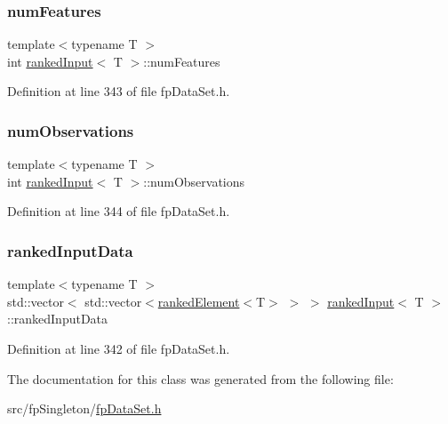 \subsubsection{\texorpdfstring{num\+Features}{numFeatures}}
{\footnotesize\ttfamily template$<$typename T $>$ \\
int \hyperlink{classrankedInput}{ranked\+Input}$<$ T $>$\+::num\+Features\hspace{0.3cm}{\ttfamily [private]}}



Definition at line 343 of file fp\+Data\+Set.\+h.

\mbox{\label{classrankedInput_a7b0e6ebcf6fa2fcd0b08918e3b3020be}} 
\subsubsection{\texorpdfstring{num\+Observations}{numObservations}}
{\footnotesize\ttfamily template$<$typename T $>$ \\
int \hyperlink{classrankedInput}{ranked\+Input}$<$ T $>$\+::num\+Observations\hspace{0.3cm}{\ttfamily [private]}}



Definition at line 344 of file fp\+Data\+Set.\+h.

\mbox{\label{classrankedInput_a5450364c3f258e15f28248a8a3c93ffa}} 
\subsubsection{\texorpdfstring{ranked\+Input\+Data}{rankedInputData}}
{\footnotesize\ttfamily template$<$typename T $>$ \\
std\+::vector$<$ std\+::vector$<$\hyperlink{classrankedElement}{ranked\+Element}$<$T$>$ $>$ $>$ \hyperlink{classrankedInput}{ranked\+Input}$<$ T $>$\+::ranked\+Input\+Data\hspace{0.3cm}{\ttfamily [private]}}



Definition at line 342 of file fp\+Data\+Set.\+h.



The documentation for this class was generated from the following file\+:\begin{DoxyCompactItemize}
\item 
src/fp\+Singleton/\hyperlink{fpDataSet_8h}{fp\+Data\+Set.\+h}\end{DoxyCompactItemize}
